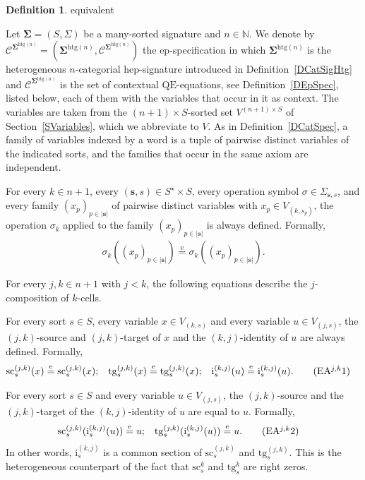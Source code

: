 \documentclass[a4paper, reqno]{amsbook}
\makeatletter
\newcommand{\sig}[1]{\mathbf{#1}}             %
\newcommand{\spec}[1]{\boldsymbol{\mathcal{#1}}} %
\newcommand{\eeq}{\overset{\mathrm e}{=}}      %
\newcommand{\QE}{\mathrm{QE}}
\newcommand{\htg}{\mathrm{htg}}                %
\newcommand{\src}{\mathrm{sc}}
\newcommand{\tgt}{\mathrm{tg}}
\theoremstyle{plain}
\theoremstyle{definition}
\newtheorem{definition}[theorem]{Definition}
\newcommand*{\CA@leanpending}{}
\newcommand*{\CA@leanrelation}{}
\newcommand*{\lean}[2]{%
  \ifcsname\string\color@lean@#1\endcsname\else
    \PackageError{main}{Unknown relation `#1' in \string\lean}{Use equivalent, weaker or stronger.}%
  \fi
  \gdef\CA@leanrelation{#1}%
  \gdef\CA@leanpending{#2}}
\makeatother
\begin{document}
\begin{definition}\label{DCatSpecHtg}\lean{equivalent}{Heterogeneous.specification}
Let $\sig{\Sigma}=(S,\Sigma)$ be a many-sorted signature and $n\in\mathbb{N}$.
We denote by $\spec{C}^{\sig{\Sigma}^{\htg(n)}}=(\sig{\Sigma}^{\htg(n)},\mathcal{C}^{\sig{\Sigma}^{\htg(n)}})$ the ep-specification in which $\sig{\Sigma}^{\htg(n)}$ is the heterogeneous $n$-categorial hep-signature introduced in Definition~\ref{DCatSigHtg} and $\mathcal{C}^{\sig{\Sigma}^{\htg(n)}}$ is the set of contextual $\QE$-equations, see Definition~\ref{DEpSpec}, listed below, each of them with the variables that occur in it as context.
The variables are taken from the $(n+1)\times S$-sorted set $V^{(n+1)\times S}$ of Section~\ref{SVariables}, which we abbreviate to $V$.
As in Definition~\ref{DCatSpec}, a family of variables indexed by a word is a tuple of pairwise distinct variables of the indicated sorts, and the families that occur in the same axiom are independent.

For every $k\in n+1$, every $(\mathbf{s},s)\in S^{\star}\times S$, every operation symbol $\sigma\in \Sigma_{\mathbf{s},s}$, and every family $(x_{p})_{p\in \lvert\mathbf{s}\rvert}$ of pairwise distinct variables with $x_{p}\in V_{(k,s_{p})}$, the operation $\sigma_{k}$ applied to the family $(x_{p})_{p\in \lvert\mathbf{s}\rvert}$ is always defined.
Formally,
\begin{align*}
\sigma_{k}((x_{p})_{p\in \lvert\mathbf{s}\rvert})\eeq\sigma_{k}((x_{p})_{p\in \lvert\mathbf{s}\rvert}).\label{ACatHtgEA0}\tag{EA0}
\end{align*}

For every $j,k\in n+1$ with $j<k$, the following equations describe the $j$-composition of $k$-cells.

For every sort $s\in S$, every variable $x\in V_{(k,s)}$ and every variable $u\in V_{(j,s)}$, the $(j,k)$-source and $(j,k)$-target of $x$ and the $(k,j)$-identity of $u$ are always defined.
Formally,
\begin{align*}
\src^{(j,k)}_{s}(x)&\eeq\src^{(j,k)}_{s}(x);
&
\tgt^{(j,k)}_{s}(x)&\eeq\tgt^{(j,k)}_{s}(x);
&
\mathrm{i}^{(k,j)}_{s}(u)&\eeq\mathrm{i}^{(k,j)}_{s}(u).\label{ACatHtgEAjk1}\tag{EA$^{j,k}$1}
\end{align*}

For every sort $s\in S$ and every variable $u\in V_{(j,s)}$, the $(j,k)$-source and the $(j,k)$-target of the $(k,j)$-identity of $u$ are equal to $u$.
Formally,
\begin{align*}
\src^{(j,k)}_{s}(\mathrm{i}^{(k,j)}_{s}(u))&\eeq u;
&
\tgt^{(j,k)}_{s}(\mathrm{i}^{(k,j)}_{s}(u))&\eeq u.\label{ACatHtgEAjk2}\tag{EA$^{j,k}$2}
\end{align*}
In other words, $\mathrm{i}^{(k,j)}_{s}$ is a common section of $\src^{(j,k)}_{s}$ and $\tgt^{(j,k)}_{s}$.
This is the heterogeneous counterpart of the fact that $\src^{k}_{s}$ and $\tgt^{k}_{s}$ are right zeros.


\end{definition}
\end{document}

